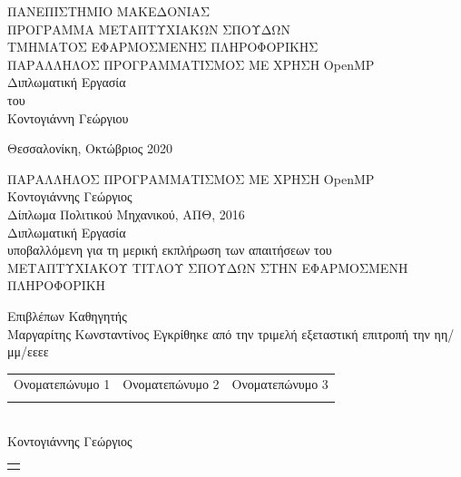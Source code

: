 \documentclass[12pt]{article}
\newcommand{\en}[1]{\foreignlanguage{english}{#1}}
\begin{document}
 \begin{center}

\textsc{ ΠΑΝΕΠΙΣΤΗΜΙΟ ΜΑΚΕΔΟΝΙΑΣ\\[0.3 cm]
ΠΡΟΓΡΑΜΜΑ ΜΕΤΑΠΤΥΧΙΑΚΩΝ ΣΠΟΥΔΩΝ\\[0.3 cm]
ΤΜΗΜΑΤΟΣ ΕΦΑΡΜΟΣΜΕΝΗΣ ΠΛΗΡΟΦΟΡΙΚΗΣ}\\[2.5 cm]
{ \large 
ΠΑΡΑΛΛΗΛΟΣ ΠΡΟΓΡΑΜΜΑΤΙΣΜΟΣ ΜΕ ΧΡΗΣΗ \en{OpenMP}\\[0.4 cm] }
Διπλωματική Εργασία\\[1 cm]
του\\[0.5 cm]
\large
Κοντογιάννη Γεώργιου
\begin{minipage}{0.4\textwidth}
\end{minipage}
\vfill
{\large Θεσσαλονίκη, Οκτώβριος 2020}

 \end{center}
 
\newpage
\mbox{}


\newpage
{}
\setcounter{page}{3} 

 \begin{center}
{\large {ΠΑΡΑΛΛΗΛΟΣ ΠΡΟΓΡΑΜΜΑΤΙΣΜΟΣ ΜΕ ΧΡΗΣΗ \en{OpenMP}}}\\[2 cm]
Κοντογιάννης Γεώργιος\\[0.5 cm]
Δίπλωμα Πολιτικού Μηχανικού, ΑΠΘ, 2016\\[2 cm]
Διπλωματική Εργασία\\[0.5 cm]
υποβαλλόμενη για τη μερική εκπλήρωση των απαιτήσεων του\\[0.5 cm]
ΜΕΤΑΠΤΥΧΙΑΚΟΥ ΤΙΤΛΟΥ ΣΠΟΥΔΩΝ ΣΤΗΝ ΕΦΑΡΜΟΣΜΕΝΗ ΠΛΗΡΟΦΟΡΙΚΗ\\[2 cm]
\begin{flushleft}
Επιβλέπων Καθηγητής\\
Μαργαρίτης Κωνσταντίνος
\vfill
Εγκρίθηκε από την τριμελή εξεταστική επιτροπή την ηη/μμ/εεεε\\[0.5 cm]
\begin{tabular}{  p{} 
                   p{} 
                   p{}  }
Ονοματεπώνυμο 1 & Ονοματεπώνυμο 2  & Ονοματεπώνυμο 3 \\[1 cm]
\dotfill & \dotfill  & \dotfill \\
\end{tabular}\\[2 cm]
Κοντογιάννης Γεώργιος \\[0.5 cm]
\begin{tabular}{  p{}   }
\dotfill
\end{tabular}\\[1 cm]
\end{flushleft}
\end{center}
  
\end{document}
